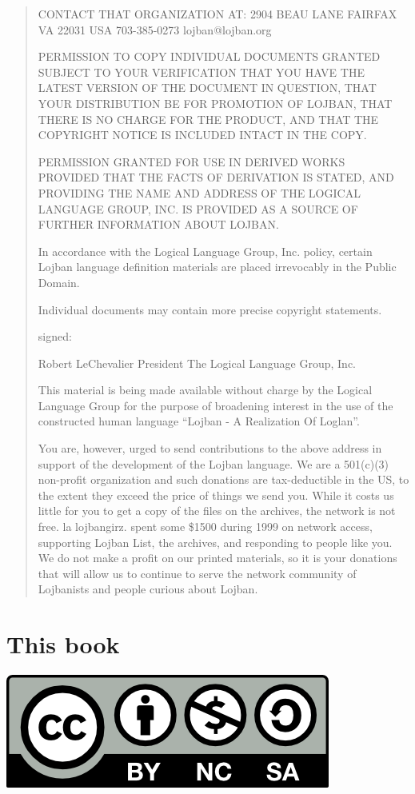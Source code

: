 \documentclass[ipa,twoside]{report}
\begin{document}
\begin{quotation}
CONTACT THAT ORGANIZATION AT: 2904 BEAU LANE FAIRFAX VA 22031 USA 703-385-0273 lojban@lojban.org

PERMISSION TO COPY INDIVIDUAL DOCUMENTS GRANTED SUBJECT TO YOUR VERIFICATION THAT YOU HAVE THE LATEST VERSION OF THE DOCUMENT IN QUESTION, THAT YOUR DISTRIBUTION BE FOR PROMOTION OF LOJBAN, THAT THERE IS NO CHARGE FOR THE PRODUCT, AND THAT THE COPYRIGHT NOTICE IS INCLUDED INTACT IN THE COPY.

PERMISSION GRANTED FOR USE IN DERIVED WORKS PROVIDED THAT THE FACTS OF DERIVATION IS STATED, AND PROVIDING THE NAME AND ADDRESS OF THE LOGICAL LANGUAGE GROUP, INC. IS PROVIDED AS A SOURCE OF FURTHER INFORMATION ABOUT LOJBAN.

In accordance with the Logical Language Group, Inc. policy, certain Lojban language definition materials are placed irrevocably in the Public Domain.

Individual documents may contain more precise copyright statements.

signed:

Robert LeChevalier President The Logical Language Group, Inc.

This material is being made available without charge by the Logical Language Group for the purpose of broadening interest in the use of the constructed human language ``Lojban - A Realization Of Loglan''.

You are, however, urged to send contributions to the above address in support of the development of the Lojban language. We are a 501(c)(3) non-profit organization and such donations are tax-deductible in the US, to the extent they exceed the price of things we send you. While it costs us little for you to get a copy of the files on the archives, the network is not free. la lojbangirz. spent some \$1500 during 1999 on network access, supporting Lojban List, the archives, and responding to people like you. We do not make a profit on our printed materials, so it is your donations that will allow us to continue to serve the network community of Lojbanists and people curious about Lojban.
\end{quotation}

\section*{This book}

\begin{center}
	\includegraphics{img/by-nc-sa.png}
\end{center}
\end{document}
